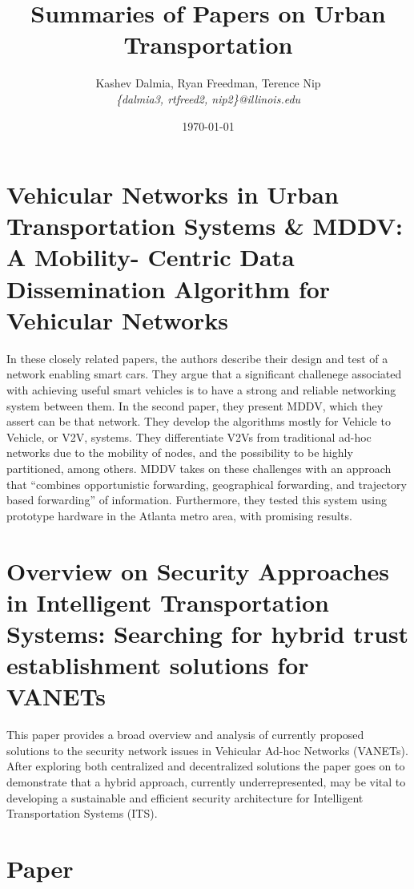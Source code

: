 \documentclass[a4paper]{article}
\title{Summaries of Papers on Urban Transportation}
\author{Kashev Dalmia, Ryan Freedman, Terence Nip \\
        \textit{\{dalmia3, rtfreed2, nip2\}@illinois.edu}
       }
\date{\today}
\begin{document}
\maketitle

\section{Vehicular Networks in Urban Transportation Systems \& MDDV: A Mobility-
Centric Data Dissemination Algorithm for Vehicular Networks}

In these closely related papers, the authors describe their design and test of a
network enabling smart cars. They argue that a significant challenege associated
with achieving useful smart vehicles is to have a strong and reliable networking
system between them. In the second paper, they present MDDV, which they assert
can be that network. They develop the algorithms mostly for Vehicle to Vehicle,
or V2V, systems. They differentiate V2Vs from traditional ad-hoc networks due to
the mobility of nodes, and the possibility to be highly partitioned, among
others. MDDV takes on these challenges with an approach that ``combines
opportunistic forwarding, geographical forwarding, and trajectory based
forwarding'' of information. Furthermore, they tested this system using
prototype hardware in the Atlanta metro area, with promising results.

\section{Overview on Security Approaches in Intelligent Transportation Systems: Searching for hybrid trust establishment solutions for VANETs}
This paper provides a broad overview and analysis of currently proposed solutions to the security network issues in Vehicular Ad-hoc Networks (VANETs). After exploring both centralized and decentralized solutions the paper goes on to demonstrate that a hybrid approach, currently underrepresented, may be vital to developing a sustainable and efficient security architecture for Intelligent Transportation Systems (ITS).


\section{Paper}
\end{document}
